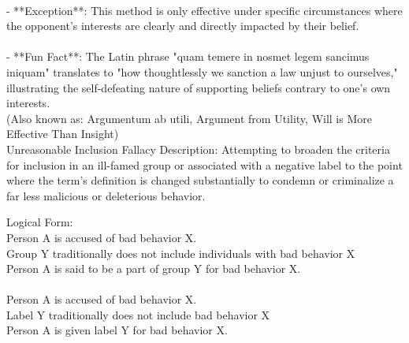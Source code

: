 \documentclass[a4paper,12pt,single,pdftex]{scrbook}
\begin{document}
    
      
    \\

    
      - **Exception**: This method is only effective under specific circumstances where the opponent's interests are clearly and directly impacted by their belief.
    \\

    
      
    \\

    
      - **Fun Fact**: The Latin phrase "quam temere in nosmet legem sancimus iniquam" translates to "how thoughtlessly we sanction a law unjust to ourselves," illustrating the self-defeating nature of supporting beliefs contrary to one’s own interests.
    \\

  
    
      (Also known as: Argumentum ab utili, Argument from Utility, Will is More Effective Than Insight)
    \\

  

Unreasonable Inclusion Fallacy
    Description: Attempting to broaden the criteria for inclusion in an ill-famed group or associated with a negative label to the point where the term's definition is changed substantially to condemn or criminalize a far less malicious or deleterious behavior.

    
      Logical Form:
    \\

    
      Person A is accused of bad behavior X.
    \\

    
      Group Y traditionally does not include individuals with bad behavior X
    \\

    
      Person A is said to be a part of group Y for bad behavior X.
    \\

    
      
    \\

    
      Person A is accused of bad behavior X.
    \\

    
      Label Y traditionally does not include bad behavior X
    \\

    
      Person A is given label Y for bad behavior X.
    \\
\end{document}
